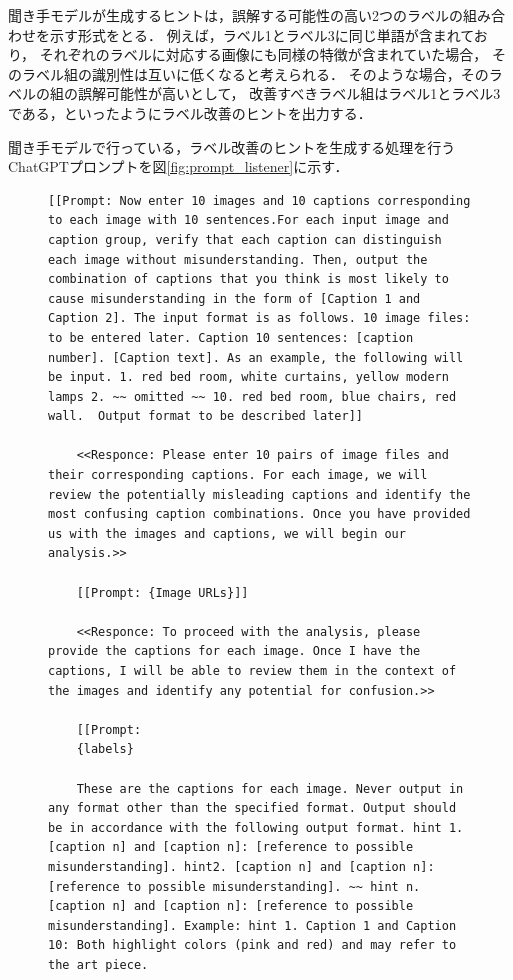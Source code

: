 \documentclass[a4paper,11pt]{jreport}
\begin{document}
聞き手モデルが生成するヒントは，誤解する可能性の高い2つのラベルの組み合わせを示す形式をとる．
例えば，ラベル1とラベル3に同じ単語が含まれており，
それぞれのラベルに対応する画像にも同様の特徴が含まれていた場合，
そのラベル組の識別性は互いに低くなると考えられる．
そのような場合，そのラベルの組の誤解可能性が高いとして，
改善すべきラベル組はラベル1とラベル3である，といったようにラベル改善のヒントを出力する．

聞き手モデルで行っている，ラベル改善のヒントを生成する処理を行うChatGPTプロンプトを図\ref{fig:prompt_listener}に示す．

\begin{figure}[h]
  \centering
  \begin{mdframed}
  \begin{lstlisting}[style=chatgptstyle]
    [[Prompt: Now enter 10 images and 10 captions corresponding to each image with 10 sentences.For each input image and caption group, verify that each caption can distinguish each image without misunderstanding. Then, output the combination of captions that you think is most likely to cause misunderstanding in the form of [Caption 1 and Caption 2]. The input format is as follows. 10 image files: to be entered later. Caption 10 sentences: [caption number]. [Caption text]. As an example, the following will be input. 1. red bed room, white curtains, yellow modern lamps 2. ~~ omitted ~~ 10. red bed room, blue chairs, red wall.  Output format to be described later]]

    <<Responce: Please enter 10 pairs of image files and their corresponding captions. For each image, we will review the potentially misleading captions and identify the most confusing caption combinations. Once you have provided us with the images and captions, we will begin our analysis.>>

    [[Prompt: {Image URLs}]]

    <<Responce: To proceed with the analysis, please provide the captions for each image. Once I have the captions, I will be able to review them in the context of the images and identify any potential for confusion.>>

    [[Prompt: 
    {labels}

    These are the captions for each image. Never output in any format other than the specified format. Output should be in accordance with the following output format. hint 1. [caption n] and [caption n]: [reference to possible misunderstanding]. hint2. [caption n] and [caption n]: [reference to possible misunderstanding]. ~~ hint n. [caption n] and [caption n]: [reference to possible misunderstanding]. Example: hint 1. Caption 1 and Caption 10: Both highlight colors (pink and red) and may refer to the art piece.
    

\end{lstlisting}
\end{mdframed}
\end{figure}
\end{document}
